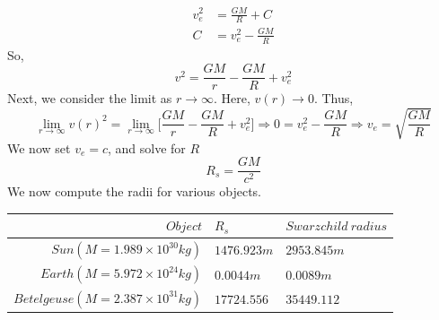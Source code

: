 \documentclass[letterpaper,10pt]{article}
\begin{document}
\begin{enumerate}
\begin{align*}
v_e^2 &= \frac{GM}{R}+C\\
C&=v_e^2-\frac{GM}{R}
\end{align*}
So,
\[v^2=\frac{GM}{r}-\frac{GM}{R}+v_e^2\]
Next, we consider the limit as $r\to\infty$. Here, $v(r)\to 0$. Thus,
\[\lim_{r\to\infty} v(r)^2= \lim_{r\to\infty}\bigg[\frac{GM}{r}-\frac{GM}{R}+v_e^2\bigg]\Rightarrow 0=v_e^2-\frac{GM}{R}\Rightarrow v_e=\sqrt{\frac{GM}{R}}\]
We now set $v_e=c$, and solve for $R$
\[R_s=\frac{GM}{c^2}\]
We now compute the radii for various objects.\\
\begin{center}
\begin{tabular}{|r|l|l|}
\hline
$Object$ & $R_s$ & $Swarzchild\ radius$\\\hline \hline
$Sun (M=1.989\times 10^{30} kg)$ & $1476.923m$ & $2953.845m$ \\\hline
$Earth (M=5.972\times 10^{24}kg)$ & $0.0044m$ & $0.0089m$\\\hline
$Betelgeuse (M=2.387\times 10^{31}kg)$ & $17724.556$ & $35449.112$ \\\hline


\end{tabular}
\end{center}
\end{enumerate}
\end{document}
